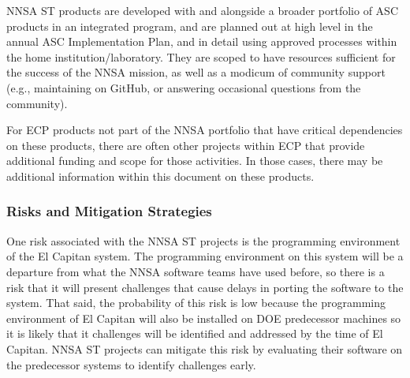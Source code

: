 NNSA ST products are developed with and alongside a broader
portfolio of ASC products in an integrated program, and are planned
out at high level in the annual ASC Implementation Plan, and in detail
using approved processes within the home institution/laboratory. They
are scoped to have 
resources sufficient for the success of the NNSA mission, as well as a
modicum of community support (e.g., maintaining on GitHub, or answering
occasional questions from the community).

For ECP products not part of the NNSA portfolio that have critical
dependencies on these products, there are often other projects within
ECP that provide additional funding and scope for those activities. In
those cases, there may be additional information within this document
on these products.


\subsubsection{Risks and Mitigation Strategies}


One risk associated with the NNSA ST projects is the programming environment
of the El Capitan system. The programming environment on this system
will be a departure from what the NNSA software teams have used before,
so there is a risk that it will present challenges that cause delays
in porting the software to the system. That said, the probability of this risk is low because 
the programming environment of El Capitan will also be installed on DOE predecessor 
machines so it is likely that it challenges will be identified and addressed by
the time of El Capitan. NNSA ST projects can mitigate this risk by 
evaluating their software on the predecessor systems to identify challenges early.

